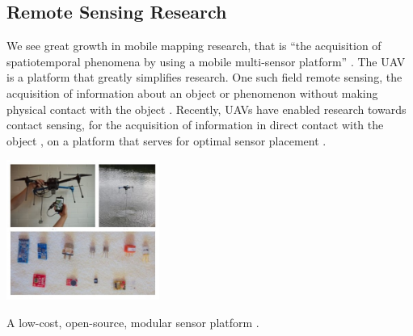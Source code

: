 
\subsection{Remote Sensing Research}


We see great growth in mobile mapping research, that is “the acquisition of spatiotemporal phenomena by using a mobile multi-sensor platform” \cite{mobile_mapping}. The UAV is a platform that greatly simplifies research. One such field remote sensing, the acquisition of information about an object or phenomenon without making physical contact with the object \cite{remote_sensing}. Recently, UAVs have enabled research towards contact sensing, for the acquisition of information in direct contact with the object \cite{sensor_placement_uav}, on a platform that serves for optimal sensor placement \cite{sensor_placement_uav} \cite{stewart_chang_sudarchan_becker_huang_2016}.

\begin{marginfigure}%
  \includegraphics[width=5cm]{images/stage_sota/arduino_drone.jpg}
  \caption{A low-cost, open-source, modular sensor platform \cite{sørensen_jacobsen_hansen_2017}.}
  \label{fig:msp}
\end{marginfigure}

